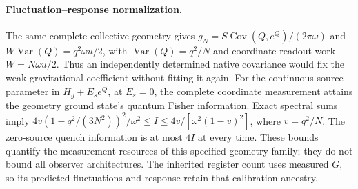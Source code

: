 \paragraph{Fluctuation--response normalization.}
The same complete collective geometry gives
$g_N=S\operatorname{Cov}(Q,e^Q)/(2\pi\omega)$ and
$W\operatorname{Var}(Q)=q^2\omega u/2$, with
$\operatorname{Var}(Q)=q^2/N$ and coordinate-readout work
$W=N\omega u/2$. Thus an independently determined native covariance would
fix the weak gravitational coefficient without fitting it again.
For the continuous source parameter in $H_g+E_s e^Q$, at $E_s=0$,
the complete coordinate measurement attains the geometry ground state's
quantum Fisher information. Exact spectral sums imply
$4v(1-q^2/(3N^2))^2/\omega^2\leq I\leq4v/[\omega^2(1-v)^2]$,
where $v=q^2/N$. The zero-source quench information is at most $4I$ at every
time. These bounds quantify the measurement resources of this specified
geometry family; they do not bound all observer architectures.
The inherited register count uses measured $G$, so its predicted fluctuations
and response retain that calibration ancestry.
